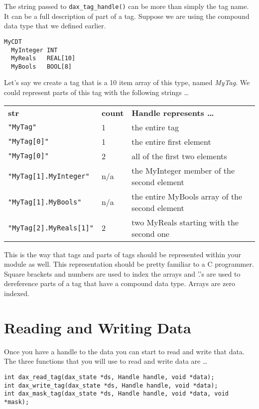 The string passed to \verb|dax_tag_handle()| can be more than simply the tag name.  It can be a full description of part of a tag.  Suppose we are using the compound data type that we defined earlier.

\begin{verbatim}
MyCDT
  MyInteger INT
  MyReals   REAL[10]
  MyBools   BOOL[8]
\end{verbatim}

Let's say we create a tag that is a 10 item array of this type, named \emph{MyTag}.  We could represent parts of this tag with the following strings \ldots

\begin{tabular}{lll}
\textbf{str} & \textbf{count} & \textbf{Handle represents \ldots} \\
\verb|"MyTag"| & 1 & the entire tag \\ 
\verb|"MyTag[0]"| & 1 & the entire first element \\ 
\verb|"MyTag[0]"| & 2 & all of the first two elements \\ 
\verb|"MyTag[1].MyInteger"| & n/a & the MyInteger member of the second element \\ 
\verb|"MyTag[1].MyBools"| & n/a & the entire MyBools array of the second element \\ 
\verb|"MyTag[2].MyReals[1]"| & 2 & two MyReals starting with the second one \\ 
\end{tabular} 

This is the way that tags and parts of tags should be represented within your module as well.  This representation should be pretty familiar to a C programmer.  Square brackets and numbers are used to index the arrays and '.'s are used to dereference parts of a tag that have a compound data type.  Arrays are zero indexed.

\section{Reading and Writing Data}

Once you have a handle to the data you can start to read and write that data.  The three functions that you will use to read and write data are \ldots

\begin{verbatim}
int dax_read_tag(dax_state *ds, Handle handle, void *data);
int dax_write_tag(dax_state *ds, Handle handle, void *data);
int dax_mask_tag(dax_state *ds, Handle handle, void *data, void *mask);
\end{verbatim}

